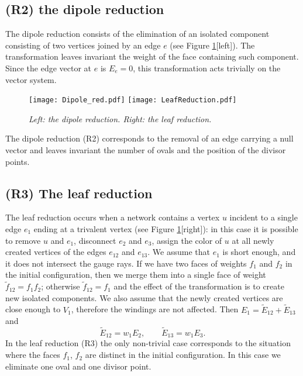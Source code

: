 \documentclass[11pt]{amsart}
\theoremstyle{plain}
\numberwithin{equation}{section}
\begin{document}
\subsection{(R2) the dipole reduction}

The dipole reduction consists of the elimination of an isolated component consisting of two vertices joined by an edge $e$ (see Figure \ref{fig:dip_leaf}[left]). The transformation leaves invariant the weight of the face containing such component. Since the edge vector at $e$ is $E_e=0$, this transformation acts trivially on the vector system.

\begin{figure}%
\texttt{[image: Dipole\_red.pdf]}
\hfill
\texttt{[image: LeafReduction.pdf]}
\vspace{-2.5 truecm}
\caption{\small{\sl Left: the dipole reduction. Right: the leaf reduction.}}
\label{fig:dip_leaf}
\end{figure}

The dipole reduction (R2) corresponds to the removal of an edge carrying a null vector and leaves invariant the number of ovals and the position of the divisor points.


\subsection{(R3) The leaf reduction}\label{sec:leaf}

The leaf reduction occurs when a network contains a vertex $u$ incident to a single edge $e_1$ ending at a trivalent vertex (see Figure \ref{fig:dip_leaf}[right]): in this case it is possible to remove $u$ and $e_1$, disconnect $e_2$ and $e_3$, assign the color of $u$ at all newly created vertices of the edges $e_{12}$ and $e_{13}$. We assume that $e_1$ is short enough, and it does not intersect the gauge rays. If we have two faces of weights $f_1$ and $f_2$ in the initial configuration, then we merge them into a single face of weight ${\tilde f}_{12} =f_1f_2$; otherwise ${\tilde f}_{12}=f_1$ and the effect of the transformation is to create new isolated components. We also assume that the newly created vertices are close enough to $V_1$, therefore the windings are not affected. Then $E_1 = {\tilde E}_{12} + {\tilde E}_{13}$ and 
\[
{\tilde E}_{12} = w_{1} E_2, \quad\quad {\tilde E}_{13} =  w_{1} E_3.
\]
In the leaf reduction (R3) the only non-trivial case corresponds to the situation where the faces $f_1$, $f_2$ are distinct in the initial configuration. In this case
we eliminate one oval and one divisor point.
\end{document}
